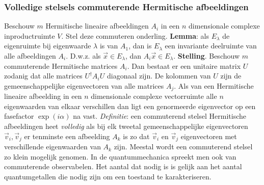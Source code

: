 \subsubsection{Volledige stelsels commuterende Hermitische afbeeldingen}
Beschouw $m$ Hermitische lineaire afbeeldingen $A_i$ in een $n$ dimensionale
complexe inproductruimte $V$. Stel deze commuteren onderling.
\npar
{\bf Lemma}: als $E_\lambda$ de eigenruimte bij eigenwaarde $\lambda$ is van
$A_1$, dan is $E_\lambda$ een invariante deelruimte van alle afbeeldingen
$A_i$. D.w.z. als $\vec{x}\in E_\lambda$, dan $A_i\vec{x}\in E_\lambda$.
\npar
{\bf Stelling}. Beschouw $m$ commuterende Hermitische matrices $A_i$. Dan
bestaat er een unitaire matrix $U$ zodanig dat alle matrices $U^\dagger A_iU$
diagonaal zijn. De kolommen van $U$ zijn de gemeenschappelijke eigenvectoren
van alle matrices $A_j$.
\npar
Als van een Hermitische lineaire afbeelding in een $n$ dimensionale complexe
vectorruimte alle $n$ eigenwaarden van elkaar verschillen dan ligt een
genormeerde eigenvector op een fasefactor $\exp(i\alpha)$ na vast.
\npar
{\it Definitie}: een commuterend stelsel Hermitische afbeeldingen heet
{\it volledig} als bij elk tweetal gemeenschappelijke eigenvectoren $\vec{v}_i,\vec{v}_j$
er tenminste een afbeelding $A_k$ is zo dat $\vec{v}_i$ en $\vec{v}_j$ eigenvectoren
met verschillende eigenwaarden van $A_k$ zijn.
\npar
Meestal wordt een commuterend stelsel zo klein mogelijk genomen. In de
quantummechanica spreekt men ook van commuterende observabelen. Het aantal
dat nodig is is gelijk aan het aantal quantumgetallen die nodig zijn om een
toestand te karakteriseren.

